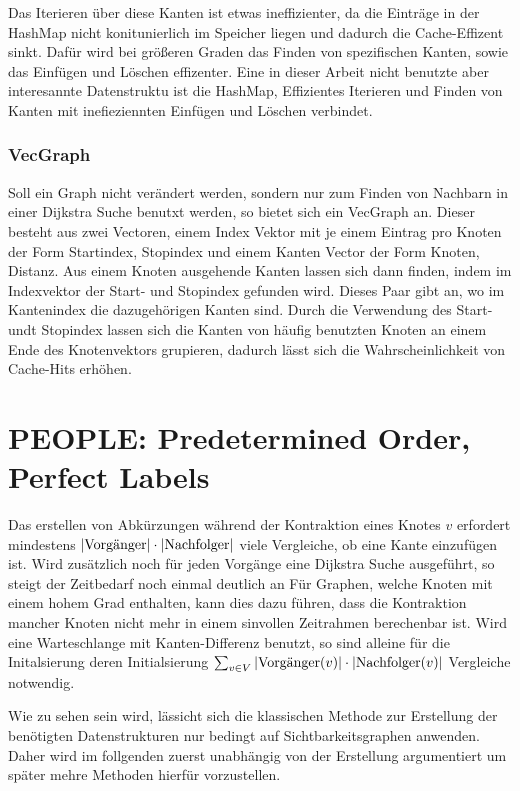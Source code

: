 Das Iterieren über diese Kanten ist etwas ineffizienter, da die Einträge in der HashMap nicht konitunierlich im Speicher liegen und dadurch die Cache-Effizent sinkt.
Dafür wird bei größeren Graden das Finden von spezifischen Kanten, sowie das Einfügen und Löschen effizenter.
Eine in dieser Arbeit nicht benutzte aber interesannte Datenstruktu ist die HashMap, Effizientes Iterieren und Finden von Kanten mit inefieziennten Einfügen und Löschen verbindet.

\subsection{VecGraph}

Soll ein Graph nicht verändert werden, sondern nur zum Finden von Nachbarn in einer Dijkstra Suche benutxt werden, so bietet sich ein VecGraph an.
Dieser besteht aus zwei Vectoren, einem Index Vektor mit je einem Eintrag pro Knoten der Form Startindex, Stopindex und einem Kanten Vector der Form Knoten, Distanz.
Aus einem Knoten ausgehende Kanten lassen sich dann finden, indem im Indexvektor der Start- und Stopindex gefunden wird.
Dieses Paar gibt an, wo im Kantenindex die dazugehörigen Kanten sind.
Durch die Verwendung des Start- undt Stopindex lassen sich die Kanten von häufig benutzten Knoten an einem Ende des Knotenvektors grupieren, dadurch lässt sich die Wahrscheinlichkeit von Cache-Hits erhöhen.

\chapter{PEOPLE: Predetermined Order, Perfect Labels}

Das erstellen von Abkürzungen während der Kontraktion eines Knotes $v$ erfordert mindestens $\abs{\text{Vorgänger}} \cdot \abs{\text{Nachfolger}}$ viele Vergleiche, ob eine Kante einzufügen ist.
Wird zusätzlich noch für jeden Vorgänge eine Dijkstra Suche ausgeführt, so steigt der Zeitbedarf noch einmal deutlich an
Für Graphen, welche Knoten mit einem hohem Grad enthalten, kann dies dazu führen, dass die Kontraktion mancher Knoten nicht mehr in einem sinvollen Zeitrahmen berechenbar ist.
Wird eine Warteschlange mit Kanten-Differenz benutzt, so sind alleine für die Initalsierung deren Initialsierung $\sum_{v \in V} \abs{\text{Vorgänger}(v)} \cdot \abs{\text{Nachfolger}(v)}$ Vergleiche notwendig.

Wie zu sehen sein wird, lässicht sich die klassischen Methode zur Erstellung der benötigten Datenstrukturen nur bedingt auf Sichtbarkeitsgraphen anwenden.
Daher wird im follgenden zuerst unabhängig von der Erstellung argumentiert um später mehre Methoden hierfür vorzustellen.

